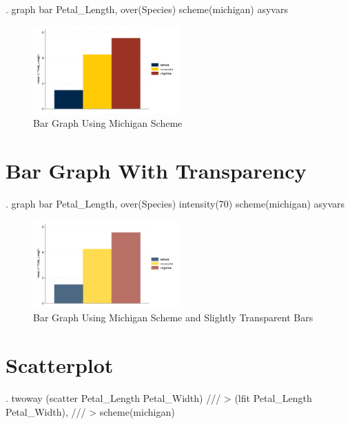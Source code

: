 \documentclass[
]{article}
\begin{document}
\begin{stlog}
. graph bar Petal_Length, over(Species) scheme(michigan) asyvars
\end{stlog}



\begin{figure}
\centering
\includegraphics[width=0.5\textwidth,height=\textheight]{mybargraph.png}
\caption{Bar Graph Using Michigan Scheme}
\end{figure}

\section{Bar Graph With Transparency}\label{bar-graph-with-transparency}

\begin{stlog}
. graph bar Petal_Length, over(Species) intensity(70) scheme(michigan) asyvars
\end{stlog}



\begin{figure}
\centering
\includegraphics[width=0.5\textwidth,height=\textheight]{mybargraph2.png}
\caption{Bar Graph Using Michigan Scheme and Slightly Transparent Bars}
\end{figure}

\section{Scatterplot}\label{scatterplot}

\begin{stlog}
. twoway (scatter Petal_Length Petal_Width) ///
> (lfit Petal_Length Petal_Width), ///
> scheme(michigan)
\end{stlog}
\end{document}
